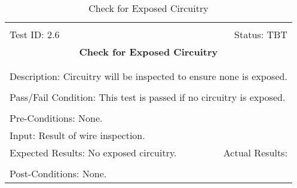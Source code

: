 \documentclass[titlepage]{article}
\begin{document}
\begin{center}%
\begin{table}[h!]
\begin{tabular}{|l r|}\hline&\\[-2mm]
	Test ID: 2.6	&Status: TBT\\[-3mm]
	\multicolumn{2}{|c|}{\textbf{\large{Check for Exposed Circuitry}}}\\&\\\hline&\\[-3mm]
	\multicolumn{2}{|p{\textwidth}|}{Description: Circuitry will be inspected to ensure none is exposed.}\\[1mm]\hline&\\[-3mm]
	\multicolumn{2}{|p{\textwidth}|}{Pass/Fail Condition: This test is passed if no circuitry is exposed.}\\[1mm]\hline&\\[-3mm]
	\multicolumn{2}{|p{\textwidth}|}{Pre-Conditions: None.}\\[4mm]
	\multicolumn{2}{|p{\textwidth}|}{Input: Result of wire inspection.}\\[2mm]\hline
	\multicolumn{1}{|p{0.49\textwidth}}{Expected Results: No exposed circuitry.}	&\multicolumn{1}{|p{0.45\textwidth}|}{Actual Results:}\\\hline&\\[-3mm]
	\multicolumn{2}{|p{\textwidth}|}{Post-Conditions: None.}\\\hline
\end{tabular}
\caption{Check for Exposed Circuitry}
\end{table}
\end{center}
\end{document}

